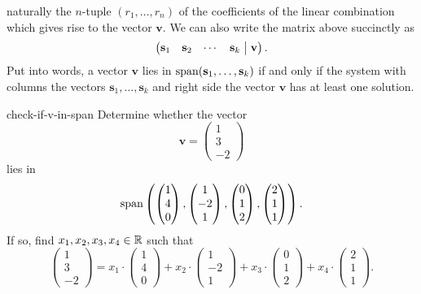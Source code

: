 naturally the $n$-tuple $(r_1,\ldots,r_n)$ of the coefficients of the linear
combination which gives rise to the vector $\mathbf{v}$. We can also write the
matrix above succinctly as
\[
 \left(
  \begin{matrix*}[c]
   \mathbf{s}_1 & \mathbf{s}_2 & \cdots & \mathbf{s}_k
  \end{matrix*}
  \hspace{1mm}
 \right|
 \left.
  \begin{matrix*}[c]
   \mathbf{v}
  \end{matrix*}
 \right).
\]
Put into words, a vector $\mathbf{v}$ lies in
$\operatorname{span}(\mathbf{s}_1,\ldots,\mathbf{s}_k)$ if and only if the system with columns
the vectors $\mathbf{s}_1,\ldots,\mathbf{s}_k$ and right side the vector
$\mathbf{v}$ has at least one solution.

\begin{problem}{}{check-if-v-in-span}
 Determine whether the vector
 \[
  \mathbf{v}=
  \begin{pmatrix}
   1\\
   3\\
   -2
  \end{pmatrix}
 \]
 lies in
 \[
  \operatorname{span} \left( 
   \begin{pmatrix}
    1\\
    4\\
    0
   \end{pmatrix},
   \begin{pmatrix}
    1\\
    -2\\
    1
   \end{pmatrix},
   \begin{pmatrix}
    0\\
    1\\
    2
   \end{pmatrix},
   \begin{pmatrix}
    2\\
    1\\
    1
   \end{pmatrix}
  \right).
 \]
 If so, find $x_1,x_2,x_3,x_4 \in \mathbb{R}$ such that
 \[
  \begin{pmatrix}
   1\\
   3\\
   -2
  \end{pmatrix}
  = x_1 \cdot 
  \begin{pmatrix}
   1\\
   4\\
   0
  \end{pmatrix}
  + x_2 \cdot 
  \begin{pmatrix}
   1\\
   -2\\
   1
  \end{pmatrix}
  + x_3 \cdot 
  \begin{pmatrix}
   0\\
   1\\
   2
  \end{pmatrix}
  + x_4 \cdot 
  \begin{pmatrix}
   2\\
   1\\
   1
  \end{pmatrix}.
 \]
\end{problem}
